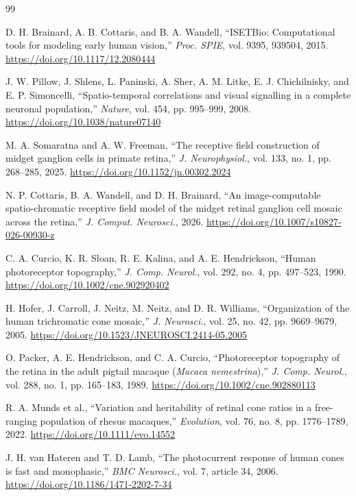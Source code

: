 \documentclass[a4paper,10pt,twocolumn,uplatex,dvipdfmx]{jsarticle}
\begin{document}
\begin{thebibliography}{99}
\small

D. H. Brainard, A. B. Cottaris, and B. A. Wandell,
``ISETBio: Computational tools for modeling early human vision,''
\textit{Proc. SPIE}, vol. 9395, 939504, 2015.
\url{https://doi.org/10.1117/12.2080444}

J. W. Pillow, J. Shlens, L. Paninski, A. Sher, A. M. Litke,
E. J. Chichilnisky, and E. P. Simoncelli,
``Spatio-temporal correlations and visual signalling in a complete
neuronal population,''
\textit{Nature}, vol. 454, pp. 995--999, 2008.
\url{https://doi.org/10.1038/nature07140}

M. A. Somaratna and A. W. Freeman,
``The receptive field construction of midget ganglion cells in primate retina,''
\textit{J. Neurophysiol.}, vol. 133, no. 1, pp. 268--285, 2025.
\url{https://doi.org/10.1152/jn.00302.2024}

N. P. Cottaris, B. A. Wandell, and D. H. Brainard,
``An image-computable spatio-chromatic receptive field model of the
midget retinal ganglion cell mosaic across the retina,''
\textit{J. Comput. Neurosci.}, 2026.
\url{https://doi.org/10.1007/s10827-026-00930-z}

C. A. Curcio, K. R. Sloan, R. E. Kalina, and A. E. Hendrickson,
``Human photoreceptor topography,''
\textit{J. Comp. Neurol.}, vol. 292, no. 4, pp. 497--523, 1990.
\url{https://doi.org/10.1002/cne.902920402}

H. Hofer, J. Carroll, J. Neitz, M. Neitz, and D. R. Williams,
``Organization of the human trichromatic cone mosaic,''
\textit{J. Neurosci.}, vol. 25, no. 42, pp. 9669--9679, 2005.
\url{https://doi.org/10.1523/JNEUROSCI.2414-05.2005}

O. Packer, A. E. Hendrickson, and C. A. Curcio,
``Photoreceptor topography of the retina in the adult pigtail macaque
(\textit{Macaca nemestrina}),''
\textit{J. Comp. Neurol.}, vol. 288, no. 1, pp. 165--183, 1989.
\url{https://doi.org/10.1002/cne.902880113}

R. A. Munds et al.,
``Variation and heritability of retinal cone ratios in a free-ranging
population of rhesus macaques,''
\textit{Evolution}, vol. 76, no. 8, pp. 1776--1789, 2022.
\url{https://doi.org/10.1111/evo.14552}

J. H. van Hateren and T. D. Lamb,
``The photocurrent response of human cones is fast and monophasic,''
\textit{BMC Neurosci.}, vol. 7, article 34, 2006.
\url{https://doi.org/10.1186/1471-2202-7-34}


\end{thebibliography}
\end{document}

